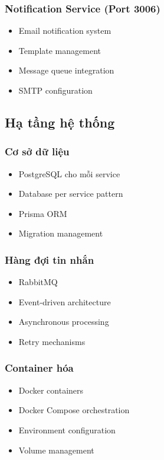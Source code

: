 \documentclass[12pt,a4paper]{report}
\begin{document}
\subsubsection{Notification Service (Port 3006)}
\begin{itemize}
    \item Email notification system
    \item Template management
    \item Message queue integration
    \item SMTP configuration
\end{itemize}

\subsection{Hạ tầng hệ thống}
\subsubsection{Cơ sở dữ liệu}
\begin{itemize}
    \item PostgreSQL cho mỗi service
    \item Database per service pattern
    \item Prisma ORM
    \item Migration management
\end{itemize}

\subsubsection{Hàng đợi tin nhắn}
\begin{itemize}
    \item RabbitMQ
    \item Event-driven architecture
    \item Asynchronous processing
    \item Retry mechanisms
\end{itemize}

\subsubsection{Container hóa}
\begin{itemize}
    \item Docker containers
    \item Docker Compose orchestration
    \item Environment configuration
    \item Volume management
\end{itemize}
\end{document}
